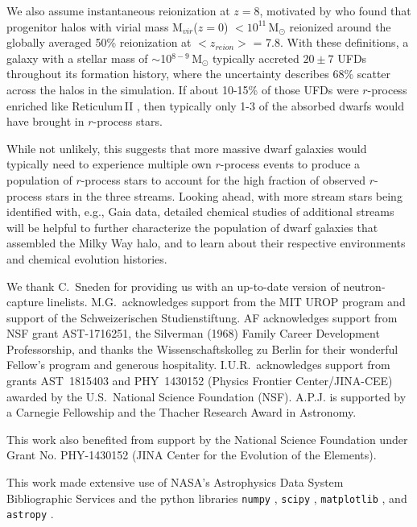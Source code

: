 \documentclass[twocolumn]{aastex63}
\begin{document}
We also assume instantaneous reionization at $z = 8$, motivated by \citet{aubert18} who found that progenitor halos with virial mass M$_{vir}$($z = 0$) $< 10^{11}$\,M$_{\odot}$ reionized around the globally averaged 50\% reionization at $<z_{reion}>$ = 7.8. 
With these definitions, a galaxy with a stellar mass of $\sim$10$^{8-9}$\,M$_{\odot}$ typically accreted $20 \pm 7$ UFDs throughout its formation history, where the uncertainty describes 68\% scatter across the halos in the simulation. If about 10-15\% of those UFDs were $r$-process enriched like Reticulum\,II \citep{Ji16a}, then typically only 1-3 of the absorbed dwarfs would have brought in $r$-process stars. 


While not unlikely, this suggests that more massive dwarf galaxies would typically need to experience multiple own $r$-process events to produce a population of $r$-process stars to account for the high fraction of observed $r$-process stars in the three streams. 
Looking ahead, with more stream stars being identified with, e.g., Gaia data, detailed chemical studies of additional streams will be helpful to further characterize the population of dwarf galaxies that assembled the Milky Way halo, and to learn about their respective environments and chemical evolution histories. 



\acknowledgements
We thank C.\ Sneden for providing us with an up-to-date version of neutron-capture linelists.
M.G.\ acknowledges  support  from  the  MIT  UROP  program and support of the Schweizerischen Studienstiftung. 
AF acknowledges support from NSF grant AST-1716251, the Silverman (1968) Family Career Development Professorship, and thanks the Wissenschaftskolleg zu Berlin for their wonderful Fellow's program and generous hospitality. 
I.U.R.\ acknowledges support from
grants AST~1815403 and
PHY~1430152 (Physics Frontier Center/JINA-CEE)
awarded by the U.S.\ National Science Foundation (NSF).
A.P.J. is supported by a Carnegie Fellowship and the Thacher Research Award in Astronomy.

This work also benefited from support by the National Science Foundation under Grant No. PHY-1430152 (JINA Center for the Evolution of the Elements).

This work made extensive use of NASA's Astrophysics Data System Bibliographic Services and the python libraries 
\texttt{numpy} \citep{numpy}, 
\texttt{scipy} \citep{scipy}, 
\texttt{matplotlib} \citep{matplotlib},
and \texttt{astropy} \citep{astropy}.
\end{document}

